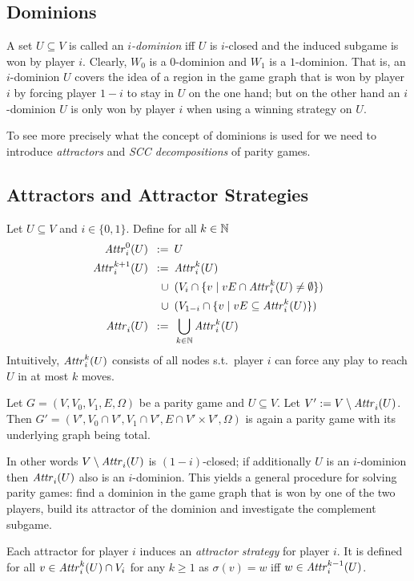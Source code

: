 \subsection{Dominions}

A set $U \subseteq V$ is called an \emph{$i$-dominion} iff $U$ is $i$-closed and the induced subgame is won by player $i$. Clearly, $W_0$ is a $0$-dominion and $W_1$ is a $1$-dominion. That is, an $i$-dominion $U$ covers the idea of a region in the game graph that is won by player $i$ by forcing player $1-i$ to stay in $U$ on the one hand; but on the other hand an $i$-dominion $U$ is only won by player $i$ when using a winning strategy on $U$.

To see more precisely what the concept of dominions is used for we need to introduce \emph{attractors} and 
\emph{SCC decompositions} of parity games.


\subsection{Attractors and Attractor Strategies}
Let $U \subseteq V$ and $i \in \{0,1\}$. Define for all $k \in \mathbb{N}$
\begin{align*}
\mathit{Attr}^{0}_{i}(U) \enspace := \enspace &U \\
\mathit{Attr}^{k+1}_{i}(U) \enspace := \enspace &\mathit{Attr}^{k}_{i}(U) \\
\cup\enspace &(V_i \cap \{ v \mid vE \cap \mathit{Attr}^{k}_{i}(U) \ne \emptyset \}) \\
\cup\enspace &(V_{1-i} \cap \{ v \mid vE \subseteq \mathit{Attr}^{k}_{i}(U) \}) \\
\mathit{Attr}^{}_{i}(U) \enspace := \enspace &\bigcup\limits_{k \in \mathbb{N}} \mathit{Attr}^{k}_{i}(U)
\end{align*}
Intuitively, $\mathit{Attr}^{k}_{i}(U)$ consists of all nodes s.t.\ player $i$ can force any play to reach $U$ in
at most $k$ moves. 

\begin{lemma}
\label{lem:minusattr}
Let $G = (V,V_0,V_1,E,\Omega)$ be a parity game and $U \subseteq V$. Let $V' := V \setminus \mathit{Attr}^{}_{i}(U)$.
Then $G' = (V',V_0 \cap V',V_1 \cap V', E \cap V'\times V',\Omega)$ is again a parity game with its
underlying graph being total.
\end{lemma}

In other words $V \setminus \mathit{Attr}^{}_{i}(U)$ is $(1-i)$-closed; if additionally $U$ is an $i$-dominion then 
$\mathit{Attr}^{}_{i}(U)$ also is an $i$-dominion. This yields a general procedure for solving parity games: find a 
dominion in the game graph that is won by one of the two players, build its attractor of the dominion and 
investigate the complement subgame.

Each attractor for player $i$ induces an \emph{attractor strategy} for player $i$. It is defined for all
$v \in \mathit{Attr}^{k}_{i}(U) \cap V_i$ for any $k \ge 1$ as $\sigma(v) = w$ iff $w \in \mathit{Attr}^{k-1}_{i}(U)$.









